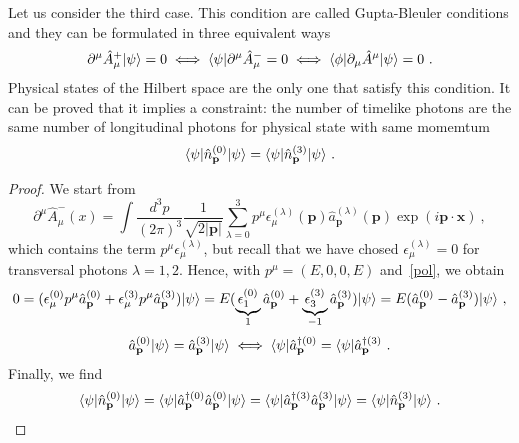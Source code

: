     Let us consider the third case. This condition are called Gupta-Bleuler conditions and they can be formulated in three equivalent ways
    \begin{equation}\label{GB}
        \partial^\mu \hat A^+_\mu \vert\psi\rangle = 0 \iff \langle\psi\vert \partial^\mu \hat A^-_\mu = 0 \iff \langle\phi\vert \partial_\mu \hat A^\mu \vert\psi\rangle = 0 ~.
    \end{equation}
    Physical states of the Hilbert space are the only one that satisfy this condition. It can be proved that it implies a constraint: the number of timelike photons are the same number of longitudinal photons for physical state with same momemtum
    \begin{equation}\label{GB2}
        \langle\psi\vert \hat n^{(0)}_{\mathbf p} \vert\psi\rangle = \langle\psi\vert \hat n^{(3)}_{\mathbf p} \vert\psi\rangle ~.
    \end{equation}
    \begin{proof}
        We start from
        \begin{equation*}
            \partial^\mu \hat A^-_\mu (x) = \int \frac{d^3 p}{(2\pi)^3} \frac{1}{\sqrt{2 |\mathbf p|}} \sum_{\lambda=0}^{3} p^\mu \epsilon_\mu^{(\lambda)} (\mathbf p) \hat a_{\mathbf p}^{(\lambda)} (\mathbf p) \exp(i \mathbf p \cdot \mathbf x) ~,
        \end{equation*}
        which contains the term $p^\mu \epsilon_\mu^{(\lambda)}$, but recall that we have chosed $\epsilon^{(\lambda)}_\mu = 0$ for transversal photons $\lambda = 1,2$. Hence, with $p^\mu = (E, 0, 0, E)$ and~\eqref{pol}, we obtain 
        \begin{equation*}
            0 = (\epsilon^{(0)}_\mu p^\mu \hat a^{(0)}_{\mathbf p} + \epsilon^{(3)}_\mu p^\mu \hat a^{(3)}_{\mathbf p}) \vert\psi\rangle = E (\underbrace{\epsilon^{(0)}_1}_1 \hat a^{(0)}_{\mathbf p} + \underbrace{\epsilon^{(3)}_3}_{-1} \hat a^{(3)}_{\mathbf p}) \vert\psi\rangle = E (\hat a^{(0)}_{\mathbf p} - \hat a^{(3)}_{\mathbf p}) \vert\psi\rangle ~,
        \end{equation*}
        \begin{equation*}
            \hat a^{(0)}_{\mathbf p} \vert\psi \rangle = \hat a^{(3)}_{\mathbf p} \vert\psi\rangle \iff \langle\psi\vert \hat a^{\dagger(0)}_{\mathbf p} = \langle\psi\vert \hat a^{\dagger(3)}_{\mathbf p}  ~.
        \end{equation*}
        Finally, we find
        \begin{equation*}
            \langle\psi\vert \hat n^{(0)}_{\mathbf p} \vert\psi\rangle = \langle\psi\vert \hat a^{\dagger(0)}_{\mathbf p} \hat a^{(0)}_{\mathbf p} \vert\psi\rangle = \langle\psi\vert \hat a^{\dagger(3)}_{\mathbf p} \hat a^{(3)}_{\mathbf p} \vert\psi\rangle = \langle\psi\vert \hat n^{(3)}_{\mathbf p} \vert\psi\rangle ~.
        \end{equation*}
    \end{proof}


